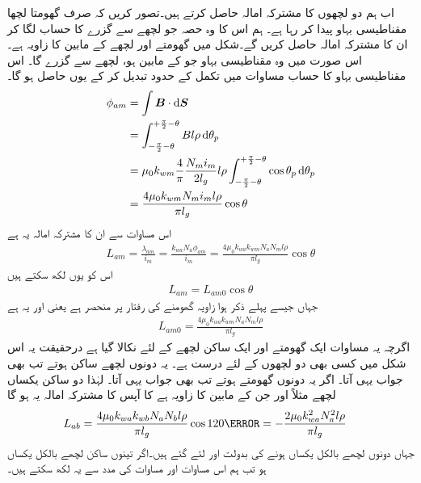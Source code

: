 اب ہم دو لچھوں کا مشترکہ امالہ حاصل کرتے ہیں۔تصور کریں کہ صرف  گھومتا لچھا مقناطیسی بہاو پیدا کر رہا ہے۔ ہم اس کا وہ حصہ جو  لچھے  سے گزرے کا حساب لگا کر ان کا مشترکہ امالہ حاصل کریں گے۔شکل   میں گھومتے اور  لچھے کے مابین کا زاویہ  ہے۔اس صورت میں وہ مقناطیسی بہاو جو  کے مابین ہو،  لچھے سے گزرے گا۔ اس مقناطیسی بہاو کا حساب مساوات   میں تکمل کے حدود تبدیل کر کے یوں حاصل ہو گا۔
\begin{gather}
\begin{aligned}
\phi_{am}&=\int \kvec{B} \cdot \dif \kvec{S}\\
&=\int_{-\frac{\pi}{2}-\theta}^{+\frac{\pi}{2}-\theta} B l \rho \dif \theta_p\\
&=\mu_0 k_{wm} \frac{4}{\pi}\frac{N_m i_m}{2 l_g} l \rho \int_{-\frac{\pi}{2}-\theta}^{+\frac{\pi}{2}-\theta} \cos \theta_p \dif \theta_p\\
&=\frac{4 \mu_0 k_{wm}  N_m i_m l \rho}{\pi l_g} \cos \theta
\end{aligned}
\end{gather}
اس مساوات سے ان کا مشترکہ امالہ  یہ ہے 
\begin{align}
L_{am}=\frac{\lambda_{am}}{i_m}=\frac{k_{wa} N_a \phi_{am}}{i_m}=\frac{4 \mu_0 k_{wa} k_{wm} N_a N_m l \rho}{\pi l_g} \cos \theta
\end{align}
اس کو یوں لکھ سکتے ہیں
\begin{align}\label{مساوات_معاصر_ساکن_گھومتا_مشترکہ_امالہ}
L_{am}=L_{am0} \cos \theta
\end{align}
جہاں جیسے پہلے ذکر ہوا زاویہ  گھومنے کی رفتار پر منحصر ہے یعنی   اور   یہ ہے
\begin{align}
L_{am0}=\frac{4 \mu_0 k_{wa} k_{wm} N_a N_m l \rho}{\pi l_g} 
\end{align}
اگرچہ یہ مساوات ایک گھومتے اور ایک ساکن لچھے کے لئے نکالا گیا ہے درحقیقت یہ اس شکل میں کسی بھی دو لچھوں کے لئے درست ہے۔ یہ دونوں لچھے ساکن ہوتے تب بھی جواب یہی آتا۔ اگر یہ دونوں گھومتے ہوتے تب بھی جواب یہی آتا۔ لہٰذا دو ساکن  یکساں لچھے مثلاً  اور  جن کے مابین  کا زاویہ ہے کا آپس کا مشترکہ امالہ یہ ہو گا
\begin{align}
L_{ab}&=\frac{4 \mu_0 k_{wa} k_{wb} N_a N_b l \rho}{\pi l_g} \cos 120\degree=-\frac{2 \mu_0 k_{wa}^2  N_a^2 l \rho}{\pi l_g}
\end{align}
جہاں دونوں لچھے بالکل یکساں ہونے کی بدولت   اور  لئے گئے ہیں۔اگر تینوں ساکن لچھے بالکل یکساں ہو تب ہم اس مساوات اور مساوات  کی مدد سے یہ لکھ سکتے ہیں۔ 
